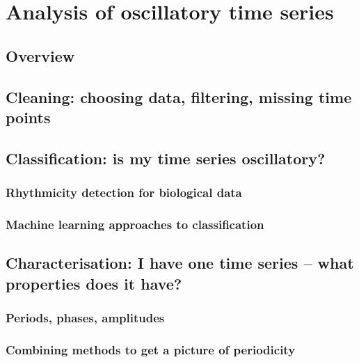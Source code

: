 \chapter{Analysis of oscillatory time series}

\section{Overview}

\section{Cleaning: choosing data, filtering, missing time points}

\section{Classification: is my time series oscillatory?}

\subsection{Rhythmicity detection for biological data}

\subsection{Machine learning approaches to classification}

\section{Characterisation: I have one time series -- what properties does it have?}

\subsection{Periods, phases, amplitudes}

\subsection{Combining methods to get a picture of periodicity}

